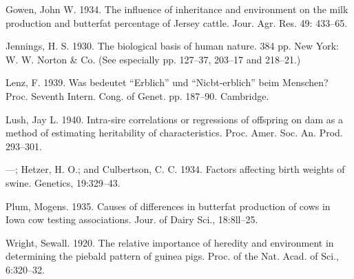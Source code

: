 \begin{hangparas}{0.5in}{1}%
Gowen, John W. 1934. The influence of inheritance and environment on the milk
production and butterfat percentage of Jersey cattle. Jour. Agr. Res. 49:
433--65.

Jennings, H. S. 1930. The biological basis of human nature. 384 pp. New York:
W. W. Norton \& Co. (See especially pp. 127--37, 203--17 and 218--21.)

Lenz, F. 1939. Was bedeutet ``Erblich'' und ``Nicbt-erblich'' beim Menschen? Proc.
Seventh Intern. Cong. of Genet. pp. 187--90. Cambridge.

Lush, Jay L. 1940. Intra-sire correlations or regressions of offspring on dam as a
method of estimating heritability of characteristics. Proc. Amer. Soc. An.
Prod. 293--301.

---; Hetzer, H. O.; and Culbertson, C. C. 1934. Factors affecting birth
weights of swine. Genetics, 19:329--43.

Plum, Mogens. 1935. Causes of differences in butterfat production of cows in Iowa
cow testing associations. Jour. of Dairy Sci., 18:8ll--25.

Wright, Sewall. 1920. The relative importance of heredity and environment in
determining the piebald pattern of guinea pigs. Proc. of the Nat. Acad.
of Sci., 6:320--32.
\end{hangparas}